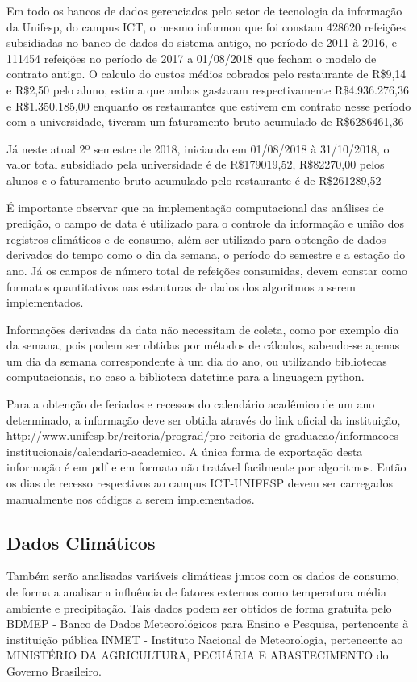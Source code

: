 \documentclass[	12pt, Times, openright, twoside, a4paper, english, brazil]{abntex2}
\begin{document}
          Em todo os bancos de dados gerenciados pelo setor de tecnologia da informação da Unifesp, do campus ICT, o mesmo informou que foi constam 428620 refeições subsidiadas no banco de dados do sistema antigo, no período de 2011 à 2016, e 111454 refeições no período de 2017 a 01/08/2018 que fecham o modelo de contrato antigo. O calculo do custos médios cobrados pelo restaurante de R\$9,14 e R\$2,50 pelo aluno, estima que ambos gastaram respectivamente R\$4.936.276,36 e R\$1.350.185,00 enquanto os restaurantes que estivem em contrato nesse período com a universidade, tiveram um faturamento bruto acumulado de R\$6286461,36

          Já neste atual 2º semestre de 2018, iniciando em 01/08/2018 à 31/10/2018, o valor total subsidiado pela universidade é de R\$179019,52, R\$82270,00 pelos alunos e o faturamento bruto acumulado pelo restaurante é de R\$261289,52

          É importante observar que na implementação computacional das análises de predição, o campo de data é utilizado para o controle da informação e união dos registros climáticos e de consumo, além ser utilizado para obtenção de dados derivados do tempo como o dia da semana, o período do semestre e a estação do ano. Já os campos de número total de refeições consumidas, devem constar como formatos quantitativos nas estruturas de dados dos algoritmos a serem implementados.

          Informações derivadas da data não necessitam de coleta, como por exemplo dia da semana, pois podem ser obtidas por métodos de cálculos, sabendo-se apenas um dia da semana correspondente à um dia do ano, ou utilizando bibliotecas computacionais, no caso a biblioteca datetime para a linguagem python.

          Para a obtenção de feriados e recessos do calendário acadêmico de um ano determinado, a informação deve ser obtida através do link oficial da instituição, http://www.unifesp.br/reitoria/prograd/pro-reitoria-de-graduacao/informacoes-institucionais/calendario-academico. A única forma de exportação desta informação é em pdf e em formato não tratável facilmente por algoritmos. Então os dias de recesso respectivos ao campus ICT-UNIFESP devem ser carregados manualmente nos códigos a serem implementados.

        \subsection{Dados Climáticos}
          Também serão analisadas variáveis climáticas juntos com os dados de consumo, de forma a analisar a influência de fatores externos como temperatura média ambiente e precipitação. Tais dados podem ser obtidos de forma gratuita pelo BDMEP - Banco de Dados Meteorológicos para Ensino e Pesquisa, pertencente à instituição pública INMET - Instituto Nacional de Meteorologia, pertencente ao MINISTÉRIO DA AGRICULTURA, PECUÁRIA E ABASTECIMENTO do Governo Brasileiro. 
\end{document}
